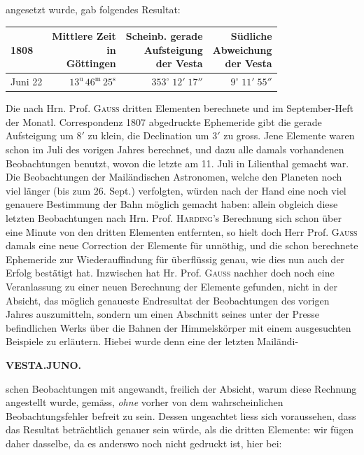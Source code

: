 \noindent angesetzt wurde, gab folgendes Resultat:


\begin{center}\fontsize{10}{12}\selectfont\setlength{\tabcolsep}{3pt}\renewcommand{\arraystretch}{1.15}\begin{tabular}{l|r|r|r}
1808 & \shortstack{Mittlere Zeit\\in\\Göttingen} & \shortstack{Scheinb. gerade\\Aufsteigung\\der Vesta} & \shortstack{Südliche\\Abweichung\\der Vesta}\\\hline
Juni 22 & $13^{\text{u}}\,46^{\text{m}}\,25^{\text{s}}$ & $353^\circ\;12'\;17''$ & $9^\circ\;11'\;55''$\\
\end{tabular}\end{center}


\par\indent Die nach Hrn. Prof. \textsc{Gauss} dritten Elementen berechnete und im September-Heft der
Monatl. Correspondenz 1807 abgedruckte Ephemeride gibt die gerade Aufsteigung um $8'$
zu klein, die Declination um $3'$ zu gross. Jene Elemente waren schon im Juli des
vorigen Jahres berechnet, und dazu alle damals vorhandenen Beobachtungen benutzt,
wovon die letzte am 11. Juli in Lilienthal gemacht war. Die Beobachtungen der
Mailändischen Astronomen, welche den Planeten noch viel länger (bis zum 26. Sept.)
verfolgten, würden nach der Hand eine noch viel genauere Bestimmung der Bahn möglich
gemacht haben: allein obgleich diese letzten Beobachtungen nach Hrn. Prof. \textsc{Harding}'s
Berechnung sich schon über eine Minute von den dritten Elementen entfernten, so
hielt doch Herr Prof. \textsc{Gauss} damals eine neue Correction der Elemente für unnöthig,
und die schon berechnete Ephemeride zur Wiederauffindung für überflüssig genau, wie
dies nun auch der Erfolg bestätigt hat. Inzwischen hat Hr. Prof. \textsc{Gauss} nachher doch
noch eine Veranlassung zu einer neuen Berechnung der Elemente gefunden, nicht in der
Absicht, das möglich genaueste Endresultat der Beobachtungen des vorigen Jahres
auszumitteln, sondern um einen Abschnitt seines unter der Presse befindlichen Werks
über die Bahnen der Himmelskörper mit einem ausgesuchten Beispiele zu erläutern.
Hiebei wurde denn eine der letzten Mailändi-\par
\clearpage
\thispagestyle{empty}
\noindent{}%
%
\parbox[t]{\dimexpr\linewidth-24mm\relax}{\centering\footnotesize\bfseries VESTA.\quad JUNO.\par}%
\makebox[12mm][r]{}\par\nobreak\medskip
\noindent schen Beobachtungen mit angewandt, freilich der Absicht, warum diese Rechnung
angestellt wurde, gemäss, \emph{ohne} vorher von dem wahrscheinlichen
Beobachtungsfehler befreit zu sein. Dessen ungeachtet liess sich voraussehen, dass
das Resultat beträchtlich genauer sein würde, als die dritten Elemente: wir fügen
daher dasselbe, da es anderswo noch nicht gedruckt ist, hier bei:

